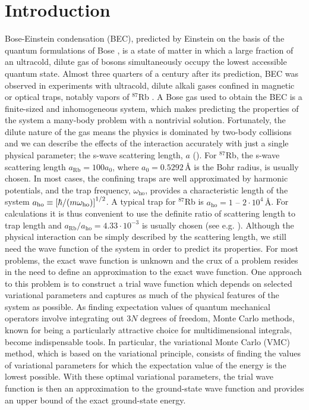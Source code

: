 \section{Introduction}\label{sec:Introduction}

Bose-Einstein condensation (BEC), predicted by Einstein \citeyearpar{BEC1924, BEC1925} on the basis of the quantum formulations of Bose \citeyearpar{Bose1924}, is a state of matter in which a large fraction of an ultracold, dilute gas of bosons simultaneously occupy the lowest accessible quantum state. Almost three quarters of a century after its prediction, BEC was observed in experiments with ultracold, dilute alkali gases confined in magnetic or optical traps, notably vapors of $^{87}$Rb \citep{BEC1995}. A Bose gas used to obtain the BEC is a finite-sized and inhomogeneous system, which makes predicting the properties of the system a many-body problem with a nontrivial solution. Fortunately, the dilute nature of the gas means the physics is dominated by two-body collisions and we can describe the effects of the interaction accurately with just a single physical parameter; the s-wave scattering length, $a$ (\cite{Dalfovo1999}). For $^{87}$Rb, the s-wave scattering length $a_\mathrm{Rb} = 100 a_0$, where $a_0 = 0.5292 \, \text{Å}$ is the Bohr radius, is usually chosen. In most cases, the confining traps are well approximated by harmonic potentials, and the trap frequency, $\omega_\mathrm{ho}$, provides a characteristic length of the system $a_\mathrm{ho} \equiv \qty[\hbar / \qty(m \omega_\mathrm{ho})]^{1/2}$. A typical trap for $^{87}$Rb is $a_\mathrm{ho}=1 \mbox{ -- } 2 \cdot 10^4 \, \text{Å}$. For calculations it is thus convenient to use the definite ratio of scattering length to trap length and $a_\mathrm{Rb} / a_\mathrm{ho} = 4.33 \cdot 10^{-3}$ is usually chosen (see e.g. \cite{DuBois2001}). Although the physical interaction can be simply described by the scattering length, we still need the wave function of the system in order to predict its properties. For most problems, the exact wave function is unknown and the crux of a problem resides in the need to define an approximation to the exact wave function. One approach to this problem is to construct a trial wave function which depends on selected variational parameters and captures as much of the physical features of the system as possible. As finding expectation values of quantum mechanical operators involve integrating out $3N$ degrees of freedom, Monte Carlo methods, known for being a particularly attractive choice for multidimensional integrals, become indispensable tools. In particular, the variational Monte Carlo (VMC) method, which is based on the variational principle, consists of finding the values of variational parameters for which the expectation value of the energy is the lowest possible. With these optimal variational parameters, the trial wave function is then an approximation to the ground-state wave function and provides an upper bound of the exact ground-state energy. 

